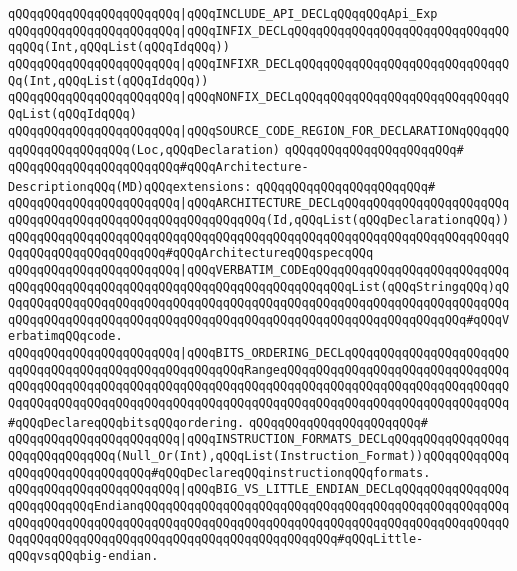 \verb|qQQqqQQqqQQqqQQqqQQqqQQq|\verb#|qQQqINCLUDE_API_DECLqQQqqQQqApi_Exp#\newline
\verb|qQQqqQQqqQQqqQQqqQQqqQQq|\verb#|qQQqINFIX_DECLqQQqqQQqqQQqqQQqqQQqqQQqqQQqqQQqqQQq(Int,qQQqList(qQQqIdqQQq))#\newline
\verb|qQQqqQQqqQQqqQQqqQQqqQQq|\verb#|qQQqINFIXR_DECLqQQqqQQqqQQqqQQqqQQqqQQqqQQqqQQq(Int,qQQqList(qQQqIdqQQq))#\newline
\verb|qQQqqQQqqQQqqQQqqQQqqQQq|\verb#|qQQqNONFIX_DECLqQQqqQQqqQQqqQQqqQQqqQQqqQQqqQQqList(qQQqIdqQQq)#\newline
\verb|qQQqqQQqqQQqqQQqqQQqqQQq|\verb#|qQQqSOURCE_CODE_REGION_FOR_DECLARATIONqQQqqQQqqQQqqQQqqQQqqQQq(Loc,qQQqDeclaration)#\newline
\verb|qQQqqQQqqQQqqQQqqQQqqQQq#|\newline
\verb|qQQqqQQqqQQqqQQqqQQqqQQq#qQQqArchitecture-DescriptionqQQq(MD)qQQqextensions:|\newline
\verb|qQQqqQQqqQQqqQQqqQQqqQQq#|\newline
\verb|qQQqqQQqqQQqqQQqqQQqqQQq|\verb#|qQQqARCHITECTURE_DECLqQQqqQQqqQQqqQQqqQQqqQQqqQQqqQQqqQQqqQQqqQQqqQQqqQQqqQQqqQQq(Id,qQQqList(qQQqDeclarationqQQq))qQQqqQQqqQQqqQQqqQQqqQQqqQQqqQQqqQQqqQQqqQQqqQQqqQQqqQQqqQQqqQQqqQQqqQQqqQQqqQQqqQQqqQQqqQQq#\verb|#qQQqArchitectureqQQqspecqQQq|\newline
\verb|qQQqqQQqqQQqqQQqqQQqqQQq|\verb#|qQQqVERBATIM_CODEqQQqqQQqqQQqqQQqqQQqqQQqqQQqqQQqqQQqqQQqqQQqqQQqqQQqqQQqqQQqqQQqqQQqqQQqqQQqList(qQQqStringqQQq)qQQqqQQqqQQqqQQqqQQqqQQqqQQqqQQqqQQqqQQqqQQqqQQqqQQqqQQqqQQqqQQqqQQqqQQqqQQqqQQqqQQqqQQqqQQqqQQqqQQqqQQqqQQqqQQqqQQqqQQqqQQqqQQqqQQqqQQq#\verb|#qQQqVerbatimqQQqcode.|\newline
\verb|qQQqqQQqqQQqqQQqqQQqqQQq|\verb#|qQQqBITS_ORDERING_DECLqQQqqQQqqQQqqQQqqQQqqQQqqQQqqQQqqQQqqQQqqQQqqQQqqQQqqQQqRangeqQQqqQQqqQQqqQQqqQQqqQQqqQQqqQQqqQQqqQQqqQQqqQQqqQQqqQQqqQQqqQQqqQQqqQQqqQQqqQQqqQQqqQQqqQQqqQQqqQQqqQQqqQQqqQQqqQQqqQQqqQQqqQQqqQQqqQQqqQQqqQQqqQQqqQQqqQQqqQQqqQQqqQQqqQQq#\verb|#qQQqDeclareqQQqbitsqQQqordering.|\newline
\verb|qQQqqQQqqQQqqQQqqQQqqQQq#|\newline
\verb|qQQqqQQqqQQqqQQqqQQqqQQq|\verb#|qQQqINSTRUCTION_FORMATS_DECLqQQqqQQqqQQqqQQqqQQqqQQqqQQqqQQq(Null_Or(Int),qQQqList(Instruction_Format))qQQqqQQqqQQqqQQqqQQqqQQqqQQqqQQq#\verb|#qQQqDeclareqQQqinstructionqQQqformats.|\newline
\verb|qQQqqQQqqQQqqQQqqQQqqQQq|\verb#|qQQqBIG_VS_LITTLE_ENDIAN_DECLqQQqqQQqqQQqqQQqqQQqqQQqqQQqEndianqQQqqQQqqQQqqQQqqQQqqQQqqQQqqQQqqQQqqQQqqQQqqQQqqQQqqQQqqQQqqQQqqQQqqQQqqQQqqQQqqQQqqQQqqQQqqQQqqQQqqQQqqQQqqQQqqQQqqQQqqQQqqQQqqQQqqQQqqQQqqQQqqQQqqQQqqQQqqQQqqQQqqQQq#\verb|#qQQqLittle-qQQqvsqQQqbig-endian.|\newline
